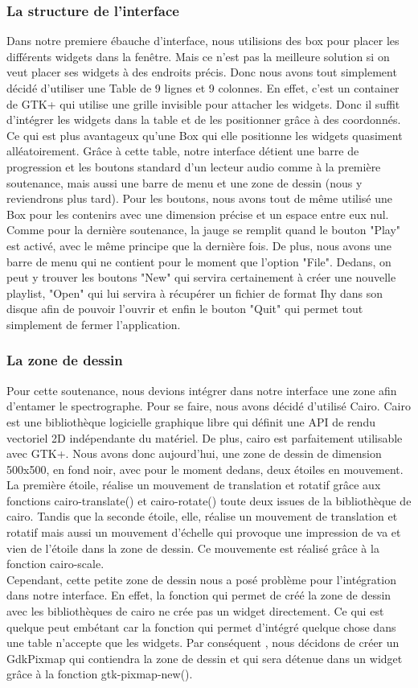 \documentclass[a4paper,12pt]{article}
\begin{document}
	\subsubsection{La structure de l'interface}
Dans notre premiere ébauche d'interface, nous utilisions des box pour placer les
différents widgets dans la fenêtre. Mais ce n'est pas la meilleure solution si 
on veut placer ses widgets à des endroits précis. Donc nous avons tout simplement 
décidé d'utiliser une Table de 9 lignes et 9 colonnes. En effet, c'est un container 
de GTK+ qui utilise une grille invisible pour attacher les widgets. Donc il suffit 
d'intégrer les widgets dans la table et de les positionner grâce à des coordonnés.
Ce qui est plus avantageux qu'une Box qui elle positionne les widgets quasiment 
alléatoirement. Grâce à cette table, notre interface détient une barre de progression 
et les boutons standard d'un lecteur audio comme à la première soutenance, mais aussi 
une barre de menu et une zone de dessin (nous y reviendrons plus tard). Pour les boutons, 
nous avons tout de même utilisé une Box pour les contenirs avec une dimension précise et un 
espace entre eux nul. Comme pour la dernière soutenance, la jauge se remplit quand
le bouton "Play" est activé, avec le même principe que la dernière fois. De plus, nous avons une 
barre de menu qui ne contient pour le moment que l'option "File". Dedans, on peut y trouver les boutons
"New" qui servira certainement à créer une nouvelle playlist, "Open" qui lui servira à 
récupérer un fichier de format Ihy dans son disque afin de pouvoir l'ouvrir et enfin 
le bouton "Quit" qui permet tout simplement de fermer l'application.
	\subsubsection{La zone de dessin}
Pour cette soutenance, nous devions intégrer dans notre interface une zone afin
d'entamer le spectrographe. Pour se faire, nous avons décidé d'utilisé Cairo.
Cairo est une bibliothèque logicielle graphique libre qui définit une API de
rendu vectoriel 2D indépendante du matériel. De plus, cairo est parfaitement
utilisable avec GTK+. Nous avons donc aujourd'hui, une zone de dessin de
dimension 500x500, en fond noir, avec pour le moment dedans, deux étoiles en
mouvement. La première étoile, réalise un mouvement de translation et rotatif 
grâce aux fonctions cairo-translate() et cairo-rotate() toute deux issues de la
bibliothèque de cairo. Tandis que la seconde étoile, elle, réalise un
mouvement de translation et rotatif mais aussi un mouvement d'échelle qui
provoque une impression de va et vien de l'étoile dans la zone de dessin. Ce
mouvemente est réalisé grâce à la fonction cairo-scale.\\
Cependant, cette petite zone de dessin nous a posé problème pour l'intégration dans
notre interface. En effet, la fonction qui permet de créé la zone de dessin avec
les bibliothèques de cairo ne crée pas un widget directement. Ce qui est quelque
peut embétant car la fonction qui permet d'intégré quelque chose dans une table
n'accepte que les widgets. Par conséquent , nous décidons de créer un GdkPixmap
qui contiendra la zone de dessin et qui sera détenue dans un widget grâce à la
fonction gtk-pixmap-new().  
\end{document}
